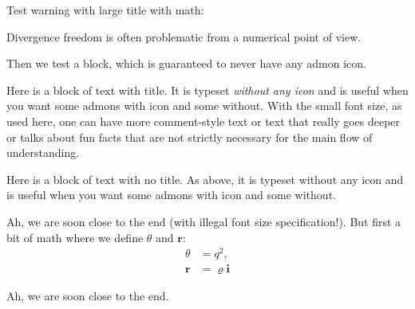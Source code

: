 \documentclass[%
oneside,                 %
final,                   %
10pt]{article}
\newenvironment{graybox2admon}[1][]{
\begin{graybox2mdframed}[frametitle=#1]
}
{
\end{graybox2mdframed}
}
\begin{document}
Test warning with large title with math:


\begin{graybox2admon}[{\large Watch out for $\nabla\cdot\bm{u}=0$ equations}.]
{\large Divergence freedom is often problematic from a numerical point
of view.
\par}
\end{graybox2admon}



Then we test a block, which is guaranteed to never have any admon icon.


\begin{graybox2admon}[Block with title.]
\vspace{0.5mm}\par\noindent
{\footnotesize Here is a block of text with title. It is typeset
\emph{without any icon} and is useful when you want some admons with icon
and some without. With the small font size, as used here, one can have
more comment-style text or text that really goes deeper or talks
about fun facts that are not strictly necessary for the main flow
of understanding.
\par}
\end{graybox2admon}





\begin{graybox2admon}[]
Here is a block of text with no title. As above, it is typeset without any icon
and is useful when you want some admons with icon and some without.
\end{graybox2admon}





\begin{graybox2admon}[Note eventually!]
Ah, we are soon close to the end (with illegal font size specification!).
But first a bit of math where we define $\theta$ and $\bm{r}$:
\begin{align*}
\theta &= q^2,\\
\bm{r} &= \varrho\bm{i}
\end{align*}
\end{graybox2admon}





\begin{graybox2admon}[Point1.]
Ah, we are soon close to the end.
\end{graybox2admon}
\end{document}
